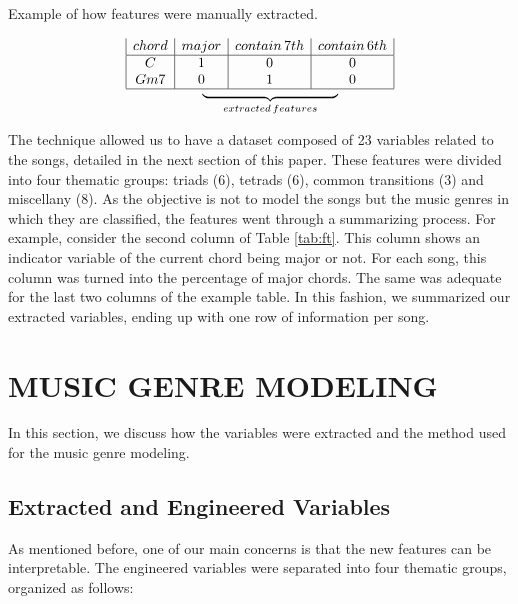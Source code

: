 \documentclass[twocolumn]{article}
\begin{document}
\begin{table}[ht]
\caption{Example of how features were manually extracted.} 
\[
  \begin{array}{|c|c|c|c|}

      chord & major
    & contain \thinspace 7th
    & contain \thinspace 6th \\
    \hline
    C   & 1 & 0 & 0 \\
    Gm7 & 0 & 1 & 0 \\
    \hline
    \multicolumn{1}{c}{} &  \multicolumn{1}{@{}l@{}}{\raisebox{.5\normalbaselineskip}{\rlap{$\quad \quad\underbrace{\hphantom{\mbox{$p\lor{}q$\hspace*{\dimexpr11\arraycolsep+\arrayrulewidth}$p\land{}q$}}}_{extracted\thinspace features}$}}}
  \end{array}
\]
\label{tab:ft}
\end{table}

The technique allowed us to have a dataset
composed of 23 variables related to the songs,
detailed in the next section
of this paper. These features were divided into four
thematic groups: triads (6),
tetrads (6), common transitions (3) and miscellany (8). 
As the objective is not to model the songs but 
the music genres in which they are classified,  
the features went through a summarizing process.
For example, consider the second column of 
Table \ref{tab:ft}. This column shows an indicator
variable of the current chord being major
or not. For each song, this column was turned into the percentage of major chords. The
same was adequate for the last two columns of the
example table. In this fashion, we summarized 
our extracted variables, ending
up with one row of information per song. 

\section{MUSIC GENRE MODELING}\label{sec:model}

In this section, we discuss how the variables
were extracted and the method used for the 
music genre modeling. 


\subsection{Extracted and Engineered Variables}

As mentioned before, one of our main
concerns is that the new features
can be interpretable. The engineered variables 
were separated into four thematic groups,
organized as follows:  
\end{document}
